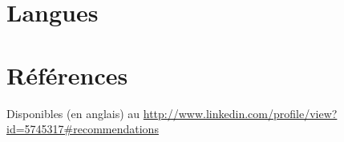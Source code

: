 \documentclass[10pt,letter,sans]{moderncv}   %
\begin{document}
\pagebreak

\section{Langues}

\section{R\'{e}f\'{e}rences}
Disponibles (en anglais) au \url{http://www.linkedin.com/profile/view?id=5745317#recommendations}


%
\end{document}
